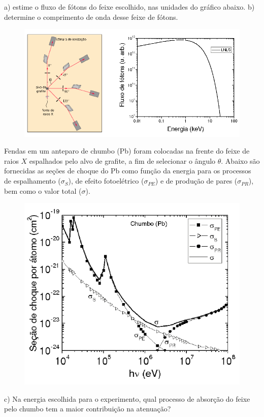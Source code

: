 \begin{enumerate}[start=1,label={\bfseries Q\arabic*.}]
a) estime o fluxo de fótons do feixe escolhido, nas unidades do gráfico abaixo.
b) determine o comprimento de onda desse feixe de fótons.
\begin{figure}[H]
\centering
\includegraphics[scale=0.8]{moderna-img/energia.png}
\end{figure}
Fendas em um anteparo de chumbo (Pb) foram colocadas na frente do feixe de raios $X$ espalhados pelo alvo de grafite, a fim de selecionar o ângulo $\theta$. Abaixo são fornecidas as seções de choque do Pb como função da energia para os processos de espalhamento ($\sigma_{S}$), de efeito fotoelétrico ($\sigma_{PE}$) e de produção de pares ($\sigma_{PR}$), bem como o valor total ($\sigma$).
\begin{figure}[H]
\centering
\includegraphics[scale=0.8]{moderna-img/energia2.png}
\end{figure}
c) Na energia escolhida para o experimento, qual processo de absorção do feixe pelo chumbo tem a maior contribuição na atenuação?

\end{enumerate}
